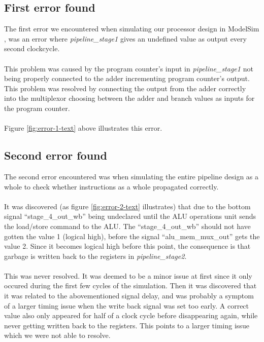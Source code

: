 \subsection{First error found}
The first error we encountered when simulating our processor design in ModelSim
\cite{modelsim}, was an error where \emph{pipeline\_stage1} gives an undefined
value as output every second clockcycle.
\paragraph*{}

This problem was caused by the program counter's input in
\emph{pipeline\_stage1} not being properly connected to the adder incrementing
program counter's output. This problem was resolved by connecting the output
from the adder correctly into the multiplexor choosing between the adder and
branch values as inputs for the program counter.
\paragraph*{}
Figure \ref{fig:error-1-text} above illustrates this error.

\subsection{Second error found}
The second error encountered was when simulating the entire pipeline design as
a whole to check whether instructions as a whole propagated correctly.
\paragraph*{}
It was discovered (as figure \ref{fig:error-2-text} illustrates) that due to the
bottom signal ``stage\_4\_out\_wb'' being undeclared until the ALU operations unit
sends the load/store command to the ALU. The ``stage\_4\_out\_wb'' should not
have gotten the value 1 (logical high), before the signal ``alu\_mem\_mux\_out''
gets the value 2. Since it becomes logical high before this point, the
consequence is that garbage is written back to the registers in
\emph{pipeline\_stage2}.

\paragraph*{}
This was never resolved. It was deemed to be a minor issue at first since it
only occured during the first few cycles of the simulation. Then it was
discovered that it was related to the abovementioned signal delay, and was
probably a symptom of a larger timing issue when the write back signal was set
too early. A correct value also only appeared for half of a clock cycle before
disappearing again, while never getting written back to the registers. This
points to a larger timing issue which we were not able to resolve.

